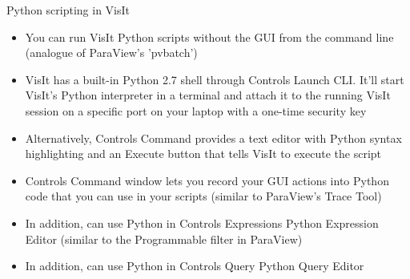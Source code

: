 \begin{comment}
http://www.visitusers.org/index.php?title=VisIt-tutorial-Python-scripting
http://www.visitusers.org/index.php?title=VisIt-tutorial-Advanced-scripting
http://www.visitusers.org/index.php?title=Exporting_databases
abc Tips for searching for help
http://www.visitusers.org/index.php?title=VisIt-tutorial-Python-scripting#Learning_the_CLI
\end{comment}


\begin{frame}{Python scripting in VisIt}{}
  \footnotesize{
    \begin{itemize}\setlength{\itemsep}{1mm}
    \item[\ding{80}] You can run VisIt Python scripts without the GUI from the command line (analogue of
      ParaView's 'pvbatch')\guiless
    \item[\ding{80}] VisIt has a built-in Python 2.7 shell through Controls \ra Launch CLI. It'll start
      VisIt's Python interpreter in a terminal and attach it to the running VisIt session on a specific
      port on your laptop with a one-time security key
    \item[\ding{80}] Alternatively, Controls \ra Command provides a text editor with Python syntax
      highlighting and an Execute button that tells VisIt to execute the script
    \item {\color{red}Controls \ra Command window lets you record your GUI actions into Python code that
      you can use in your scripts (similar to ParaView's Trace Tool)}
    \item {\color{blue}In addition, can use Python in Controls \ra Expressions \ra Python Expression
      Editor (similar to the Programmable filter in ParaView)}
    \item {\color{blue}In addition, can use Python in Controls \ra Query \ra Python Query Editor}
    \end{itemize}}
\end{frame}


